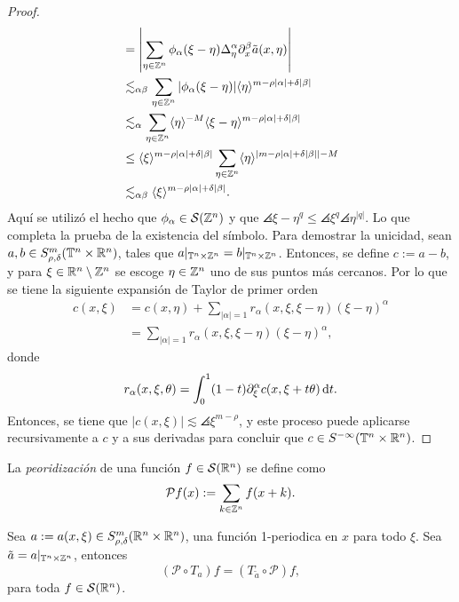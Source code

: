 \begin{proof}
\begin{align*}
		& = \left| \sum_{\eta\in\mathbb{Z}^n} \phi_\alpha(\xi-\eta)\Delta^\alpha_\eta\partial^\beta_x\tilde{a}(x, \eta) \right|\\
		& \lesssim_{\alpha\beta} \sum_{\eta\in\mathbb{Z}^n} |\phi_\alpha(\xi-\eta)| \langle\eta\rangle^{m-\rho|\alpha|+\delta|\beta|} \\
		& \lesssim_{\alpha} \sum_{\eta\in\mathbb{Z}^n} \langle\eta\rangle^{-M}  \langle\xi-\eta\rangle^{m-\rho|\alpha|+\delta|\beta|}  \\
		& \leq \langle\xi\rangle^{m-\rho|\alpha|+\delta|\beta|} \sum_{\eta\in\mathbb{Z}^n} \langle\eta\rangle^{|m-\rho|\alpha|+\delta|\beta|| - M} \\
		& \lesssim_{\alpha\beta} \langle\xi\rangle^{m-\rho|\alpha|+\delta|\beta|}.
	\end{align*}
	Aquí se utilizó el hecho que $\phi_\alpha\in\mathcal{S}(\mathbb{Z}^n)$ y que $\angles{\xi-\eta}^q \leq \angles{\xi}^q \angles{\eta}^{|q|}$. Lo que completa la prueba de la existencia del símbolo. Para demostrar la unicidad, sean $a,b\in S^m_{\rho,\delta}(\mathbb{T}^n\times\mathbb{R}^n)$, tales que $a|_{\mathbb{T}^n\times\mathbb{Z}^n} = b|_{\mathbb{T}^n\times\mathbb{Z}^n}$. Entonces, se define $c:=a-b$, y para $\xi\in\mathbb{R}^n\setminus\mathbb{Z}^n$ se escoge $\eta\in\mathbb{Z}^n$ uno de sus puntos más cercanos. Por lo que se tiene la siguiente expansión de Taylor de primer orden
	\begin{align*}
		c(x, \xi) & = c(x, \eta) + \sum_{|\alpha|=1} r_\alpha(x, \xi, \xi-\eta)(\xi-\eta)^\alpha \\
		& = \sum_{|\alpha|=1} r_\alpha(x, \xi, \xi-\eta)(\xi-\eta)^\alpha,
	\end{align*}
	donde
	\begin{equation*}
		r_\alpha(x, \xi, \theta) = \int_0^1(1-t)\partial^\alpha_\xi c(x, \xi+t\theta)\mathop{}\!\mathrm{d} t.
	\end{equation*}
	Entonces, se tiene que $|c(x, \xi)| \lesssim \angles{\xi}^{m-\rho}$, y este proceso puede aplicarse recursivamente a $c$ y a sus derivadas para concluir que $c\in S^{-\infty}(\mathbb{T}^n\times\mathbb{R}^n)$.
\end{proof}
\begin{definition}[Periodización]
	La \textit{peoridización} de una función $f\in\mathcal{S}(\mathbb{R}^n)$ se define como
	\begin{equation*}
		\mathcal{P}f(x):= \sum_{k\in\mathbb{Z}^n} f(x + k).
	\end{equation*}
\end{definition}
\begin{theorem}
	Sea $a:=a(x, \xi)\in S^m_{\rho, \delta}(\mathbb{R}^n\times\mathbb{R}^n)$, una función 1-periodica en $x$ para todo $\xi$. Sea $\tilde{a}=a|_{\mathbb{T}^n\times\mathbb{Z}^n}$, entonces 
	\begin{equation*}
		(\mathcal{P}\circ T_a) f = (T_{\tilde{a}}\circ \mathcal{P})f,
	\end{equation*}
	para toda $f\in\mathcal{S}(\mathbb{R}^n)$.
\end{theorem}
